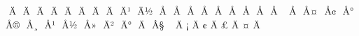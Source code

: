 
\mubyte ^^80 ^^c4^^82\endmubyte %
\mubyte ^^81 ^^c4^^84\endmubyte %
\mubyte ^^82 ^^c4^^86\endmubyte %
\mubyte ^^83 ^^c4^^8c\endmubyte %
\mubyte ^^84 ^^c4^^8e\endmubyte %
\mubyte ^^85 ^^c4^^9a\endmubyte %
\mubyte ^^86 ^^c4^^98\endmubyte %
\mubyte ^^87 ^^c4^^9e\endmubyte %
\mubyte ^^88 ^^c4^^b9\endmubyte %
\mubyte ^^89 ^^c4^^bd\endmubyte %
\mubyte ^^8a ^^c5^^81\endmubyte %
\mubyte ^^8b ^^c5^^83\endmubyte %
\mubyte ^^8c ^^c5^^87\endmubyte %
\mubyte ^^8d ^^c5^^8a\endmubyte %
\mubyte ^^8e ^^c5^^90\endmubyte %
\mubyte ^^8f ^^c5^^94\endmubyte %
\mubyte ^^90 ^^c5^^98\endmubyte %
\mubyte ^^91 ^^c5^^9a\endmubyte %
\mubyte ^^92 ^^c5^^a0\endmubyte %
\mubyte ^^93 ^^c5^^9e\endmubyte %
\mubyte ^^94 ^^c5^^a4\endmubyte %
\mubyte ^^95 ^^c5^^a2\endmubyte %
\mubyte ^^96 ^^c5^^b0\endmubyte %
\mubyte ^^97 ^^c5^^ae\endmubyte %
\mubyte ^^98 ^^c5^^b8\endmubyte %
\mubyte ^^99 ^^c5^^b9\endmubyte %
\mubyte ^^9a ^^c5^^bd\endmubyte %
\mubyte ^^9b ^^c5^^bb\endmubyte %
\mubyte ^^9c ^^c4^^b2\endmubyte %
\mubyte ^^9d ^^c4^^b0\endmubyte %
\mubyte ^^9e ^^c4^^91\endmubyte %
\mubyte ^^9f ^^c2^^a7\endmubyte %
\mubyte ^^a0 ^^c4^^83\endmubyte %
\mubyte ^^a1 ^^c4^^85\endmubyte %
\mubyte ^^a2 ^^c4^^87\endmubyte %
\mubyte ^^a3 ^^c4^^8d\endmubyte %
\mubyte ^^a4 ^^c4^^8f\endmubyte %
